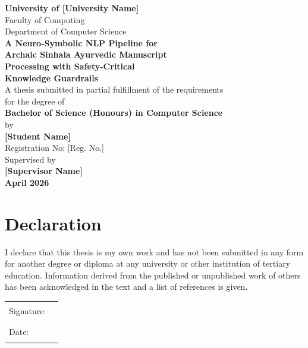 \documentclass[12pt, a4paper, twoside]{report}
\begin{document}
\begin{titlepage}
\centering
\vspace*{2cm}
{\LARGE \textbf{University of [University Name]}}\\[0.3cm]
{\large Faculty of Computing}\\[0.3cm]
{\large Department of Computer Science}\\[2cm]

{\Huge \textbf{A Neuro-Symbolic NLP Pipeline for\\[0.3cm]
Archaic Sinhala Ayurvedic Manuscript\\[0.3cm]
Processing with Safety-Critical\\[0.3cm]
Knowledge Guardrails}}\\[2cm]

{\Large A thesis submitted in partial fulfillment of the requirements\\
for the degree of}\\[0.5cm]
{\LARGE \textbf{Bachelor of Science (Honours) in Computer Science}}\\[2cm]

{\large by}\\[0.3cm]
{\Large \textbf{[Student Name]}}\\[0.3cm]
{\large Registration No: [Reg. No.]}\\[2cm]

{\large Supervised by}\\[0.3cm]
{\Large \textbf{[Supervisor Name]}}\\[2cm]

{\large \textbf{April 2026}}
\end{titlepage}

\chapter*{Declaration}

I declare that this thesis is my own work and has not been submitted in any form for another degree or diploma at any university or other institution of tertiary education. Information derived from the published or unpublished work of others has been acknowledged in the text and a list of references is given.

\vspace{2cm}
\noindent
\begin{tabular}{ll}
Signature: & \rule{6cm}{0.4pt} \\[1cm]
Date: & \rule{6cm}{0.4pt} \\[2cm]
\end{tabular}
\end{document}

